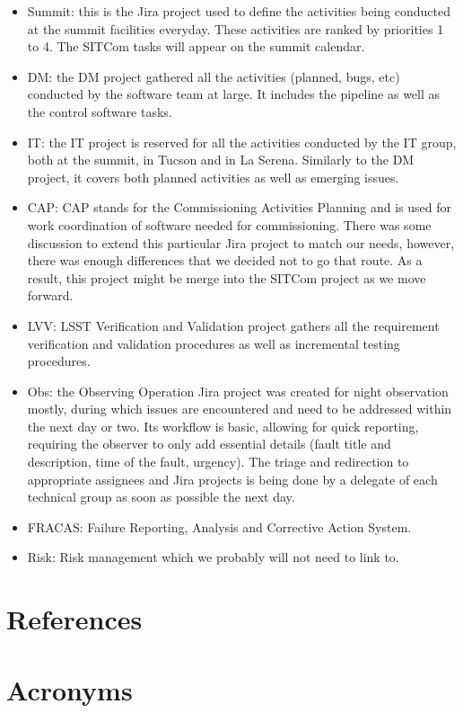 \documentclass[SE,authoryear,toc]{lsstdoc}
\begin{document}
\begin{itemize}
\item Summit: this is the Jira project used to define the activities being conducted at the summit facilities everyday. These activities are ranked by priorities 1 to 4.  The SITCom tasks will appear on the summit calendar.
\item DM: the DM project gathered all the activities (planned, bugs, etc) conducted by the software team at large. It includes the pipeline as well as the control software tasks. 
\item IT: the IT project is reserved for all the activities conducted by the IT group, both at the summit, in Tucson and in La Serena. Similarly to the DM project, it covers both planned activities as well as emerging issues. 
\item CAP: CAP stands for the Commissioning Activities Planning and is used for work coordination of software needed for commissioning. There was some discussion to extend this particular Jira project to match our needs, however, there was enough differences that we decided not to go that route. As a result, this project might be merge into the SITCom project as we move forward.  
\item LVV: LSST Verification and Validation project gathers all the requirement verification and validation procedures as well as incremental testing procedures.
\item Obs: the Observing Operation Jira project was created for night observation mostly, during which issues are encountered and need to be addressed within the next day or two. Its workflow is basic, allowing for quick reporting, requiring the observer to only add essential details (fault title and description, time of the fault, urgency). The triage and redirection to appropriate assignees and Jira projects is being done by a delegate of each technical group as soon as possible the next day.
\item FRACAS: Failure Reporting, Analysis and Corrective Action System. 
\item Risk: Risk management which we probably will not need to link to. 
\end{itemize}


\appendix
\section{References} \label{sec:bib}
%

\section{Acronyms} \label{sec:acronyms}

\end{document}
